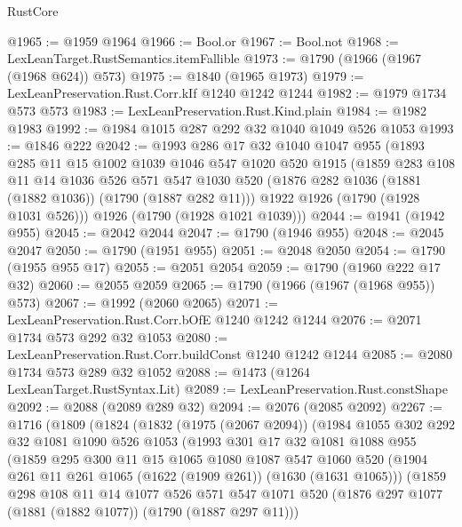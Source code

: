 \begin{lexlean}{RustCore}
\begin{coremodule}
@1965 := @1959 @1964
@1966 := Bool.or
@1967 := Bool.not
@1968 := LexLeanTarget.RustSemantics.itemFallible
@1973 := @1790 (@1966 (@1967 (@1968 @624)) @573)
@1975 := @1840 (@1965 @1973)
@1979 := LexLeanPreservation.Rust.Corr.kIf @1240 @1242 @1244
@1982 := @1979 @1734 @573 @573
@1983 := LexLeanPreservation.Rust.Kind.plain
@1984 := @1982 @1983
@1992 := @1984 @1015 @287 @292 @32 @1040 @1049 @526 @1053
@1993 := @1846 @222
@2042 := @1993
    @286
    @17
    @32
    @1040
    @1047
    @955
    (@1893
      @285
      @11
      @15
      @1002
      @1039
      @1046
      @547
      @1020
      @520
      @1915
      (@1859
        @283
        @108
        @11
        @14
        @1036
        @526
        @571
        @547
        @1030
        @520
        (@1876 @282 @1036 (@1881 (@1882 @1036)) (@1790 (@1887 @282 @11)))
        @1922
        @1926
        (@1790 (@1928 @1031 @526)))
      @1926
      (@1790 (@1928 @1021 @1039)))
@2044 := @1941 (@1942 @955)
@2045 := @2042 @2044
@2047 := @1790 (@1946 @955)
@2048 := @2045 @2047
@2050 := @1790 (@1951 @955)
@2051 := @2048 @2050
@2054 := @1790 (@1955 @955 @17)
@2055 := @2051 @2054
@2059 := @1790 (@1960 @222 @17 @32)
@2060 := @2055 @2059
@2065 := @1790 (@1966 (@1967 (@1968 @955)) @573)
@2067 := @1992 (@2060 @2065)
@2071 := LexLeanPreservation.Rust.Corr.bOfE @1240 @1242 @1244
@2076 := @2071 @1734 @573 @292 @32 @1053
@2080 := LexLeanPreservation.Rust.Corr.buildConst @1240 @1242 @1244
@2085 := @2080 @1734 @573 @289 @32 @1052
@2088 := @1473 (@1264 LexLeanTarget.RustSyntax.Lit)
@2089 := LexLeanPreservation.Rust.constShape
@2092 := @2088 (@2089 @289 @32)
@2094 := @2076 (@2085 @2092)
@2267 := @1716
    (@1809
      (@1824
        (@1832
          (@1975 (@2067 @2094))
          (@1984
            @1055
            @302
            @292
            @32
            @1081
            @1090
            @526
            @1053
            (@1993
              @301
              @17
              @32
              @1081
              @1088
              @955
              (@1859
                @295
                @300
                @11
                @15
                @1065
                @1080
                @1087
                @547
                @1060
                @520
                (@1904 @261 @11 @261 @1065 (@1622 (@1909 @261)) (@1630 (@1631 @1065)))
                (@1859
                  @298
                  @108
                  @11
                  @14
                  @1077
                  @526
                  @571
                  @547
                  @1071
                  @520
                  (@1876 @297 @1077 (@1881 (@1882 @1077)) (@1790 (@1887 @297 @11)))

\end{coremodule}
\end{lexlean}
